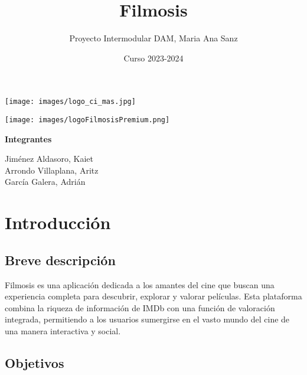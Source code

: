 \documentclass{article}
\title{Filmosis}
\author{Proyecto Intermodular DAM, Maria Ana Sanz}
\date{Curso 2023-2024}
\begin{document}
\begin{titlepage}
    \centering

    \maketitle

    \texttt{[image: images/logo\_ci\_mas.jpg]}

    \vspace{1cm}
    
    \texttt{[image: images/logoFilmosisPremium.png]}
    
    \vspace{1cm}
    
    \textbf{Integrantes}
    
    \vspace{0.5cm}
    
    \begin{minipage}{0.5\textwidth}
        \centering
        Jiménez Aldasoro, Kaiet \\
        Arrondo Villaplana, Aritz \\
        García Galera, Adrián
    \end{minipage}
    
\end{titlepage}

\renewcommand{\contentsname}{Índice}
\tableofcontents

\newpage

\section{Introducción}

    \subsection{Breve descripción}
    
    Filmosis es una aplicación dedicada a los amantes del cine que buscan una experiencia completa para descubrir, explorar y valorar películas. Esta plataforma combina la riqueza de información de IMDb con una función de valoración integrada, permitiendo a los usuarios sumergirse en el vasto mundo del cine de una manera interactiva y social.
    
    \subsection{Objetivos}
    
\end{document}
